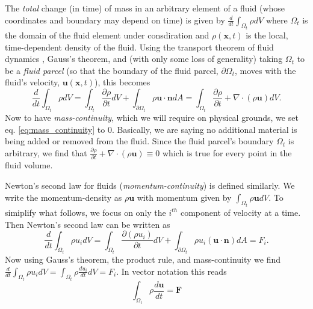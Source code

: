 \documentclass[rmp,aps,nofootinbib,superscriptaddress,floatfix]{revtex4-2}
\begin{document}
The \emph{total} change (in time) of mass in an arbitrary element of a fluid (whose coordinates and boundary may depend on time) is given by  $\frac{d}{dt} \int_{\Omega_t} \rho dV$ where $\Omega_t$ is the domain of the fluid element under consdiration and $\rho(\bm{x},t)$ is the local, time-dependent density of the fluid. Using the transport theorem of fluid dynamics \cite{mcdonough2009lectures}, Gauss's theorem, and (with only some loss of generality) taking $\Omega_t$ to be a \emph{fluid parcel} (so that the boundary of the fluid parcel, $\partial \Omega_t$, moves with the fluid's velocity, $\bm{u}(\bm{x},t)$), this becomes
\begin{equation}
    \frac{d}{dt} \int_{\Omega_t} \rho dV = \int_{\Omega_t} \frac{\partial \rho}{\partial t} dV+\int_{\partial \Omega_t} \rho \bm{u} \cdot \bm{n} dA = \int_{\Omega_t} \frac{\partial \rho}{\partial t}+\nabla \cdot(\rho \bm{u})dV.
    \label{eq:mass_continuity}
\end{equation}
Now to have \emph{mass-continuity}, which we will require on physical grounds, we set eq. \ref{eq:mass_continuity} to 0. Basically, we are saying no additional material is being added or removed from the fluid. Since the fluid parcel's boundary $\Omega_t$ is arbitrary, we find that $\frac{\partial \rho}{\partial t}+\nabla\cdot(\rho \bm{u})\equiv 0$ which is true for every point in the fluid volume.

Newton's second law for fluids (\emph{momentum-continuity}) is defined similarly. We write the momentum-density as $\rho \bm{u}$ with momentum given by $\int_{\Omega_t} \rho \bm{u} dV$. To simiplify what follows, we focus on only the $i^{th}$ component of velocity at a time. Then Newton's second law can be written as 
\begin{equation}
    \frac{d}{dt} \int_{\Omega_t} \rho u_i dV =  \int_{\Omega_t} \frac{\partial (\rho u_i)}{\partial t} dV+\int_{\partial \Omega_t} \rho u_i ( \bm{u} \cdot \bm{n}) dA = F_i.
\end{equation}
Now using Gauss's theorem, the product rule, and mass-continuity we find $ \frac{d}{dt} \int_{\Omega_t} \rho u_i dV =  \int_{\Omega_t} \rho \frac{d u_i}{dt} dV = F_i $. In vector notation this reads
\begin{equation}
    \int_{\Omega_t} \rho \frac{d \bm{u}}{dt} = \bm{F}
    \label{eq:mom_continuity}
\end{equation}
 
\end{document}
